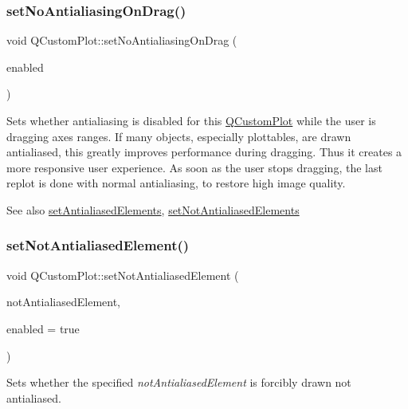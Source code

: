 \subsubsection{\texorpdfstring{set\+No\+Antialiasing\+On\+Drag()}{setNoAntialiasingOnDrag()}}
{\footnotesize\ttfamily void Q\+Custom\+Plot\+::set\+No\+Antialiasing\+On\+Drag (\begin{DoxyParamCaption}\item[{bool}]{enabled }\end{DoxyParamCaption})}

Sets whether antialiasing is disabled for this \hyperlink{class_q_custom_plot}{Q\+Custom\+Plot} while the user is dragging axes ranges. If many objects, especially plottables, are drawn antialiased, this greatly improves performance during dragging. Thus it creates a more responsive user experience. As soon as the user stops dragging, the last replot is done with normal antialiasing, to restore high image quality.

\begin{DoxySeeAlso}{See also}
\hyperlink{class_q_custom_plot_af6f91e5eab1be85f67c556e98c3745e8}{set\+Antialiased\+Elements}, \hyperlink{class_q_custom_plot_ae10d685b5eabea2999fb8775ca173c24}{set\+Not\+Antialiased\+Elements} 
\end{DoxySeeAlso}
\mbox{\label{class_q_custom_plot_afc657938a707c890e449ae89203a076d}} 
\subsubsection{\texorpdfstring{set\+Not\+Antialiased\+Element()}{setNotAntialiasedElement()}}
{\footnotesize\ttfamily void Q\+Custom\+Plot\+::set\+Not\+Antialiased\+Element (\begin{DoxyParamCaption}\item[{\hyperlink{namespace_q_c_p_ae55dbe315d41fe80f29ba88100843a0c}{Q\+C\+P\+::\+Antialiased\+Element}}]{not\+Antialiased\+Element,  }\item[{bool}]{enabled = {\ttfamily true} }\end{DoxyParamCaption})}

Sets whether the specified {\itshape not\+Antialiased\+Element} is forcibly drawn not antialiased.

